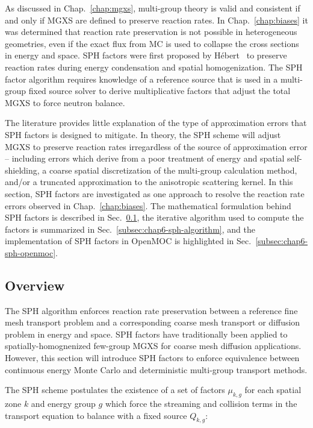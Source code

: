 As discussed in Chap.~\ref{chap:mgxs}, multi-group theory is valid and consistent if and only if \ac{MGXS} are defined to preserve reaction rates. In Chap.~\ref{chap:biases} it was determined that reaction rate preservation is not possible in heterogeneous geometries, even if the exact flux from \ac{MC} is used to collapse the cross sections in energy and space. \ac{SPH} factors were first proposed by H\'{e}bert~\cite{hebert1993consistent} to preserve reaction rates during energy condensation and spatial homogenization. The \ac{SPH} factor algorithm requires knowledge of a reference source that is used in a multi-group fixed source solver to derive multiplicative factors that adjust the total \ac{MGXS} to force neutron balance. 

The literature provides little explanation of the type of approximation errors that \ac{SPH} factors is designed to mitigate. In theory, the \ac{SPH} scheme will adjust \ac{MGXS} to preserve reaction rates irregardless of the source of approximation error -- including errors which derive from a poor treatment of energy and spatial self-shielding, a coarse spatial discretization of the multi-group calculation method, and/or a truncated approximation to the anisotropic scattering kernel. In this section, \ac{SPH} factors are investigated as one approach to resolve the reaction rate errors observed in Chap.~\ref{chap:biases}. The mathematical formulation behind \ac{SPH} factors is described in Sec.~\ref{subsec:chap6-sph-overview}, the iterative algorithm used to compute the factors is summarized in Sec.~\ref{subsec:chap6-sph-algorithm}, and the implementation of \ac{SPH} factors in OpenMOC is highlighted in Sec.~\ref{subsec:chap6-sph-openmoc}.

\subsection{Overview}
\label{subsec:chap6-sph-overview}

The \ac{SPH} algorithm enforces reaction rate preservation between a reference fine mesh transport problem and a corresponding coarse mesh transport or diffusion problem in energy and space. \ac{SPH} factors have traditionally been applied to spatially-homognenized few-group \ac{MGXS} for coarse mesh diffusion applications. However, this section will introduce \ac{SPH} factors to enforce equivalence between continuous energy Monte Carlo and deterministic multi-group transport methods. 

The \ac{SPH} scheme postulates the existence of a set of factors $\mu_{k,g}$ for each spatial zone $k$ and energy group $g$ which force the streaming and collision terms in the transport equation to balance with a fixed source $Q_{k,g}$:


